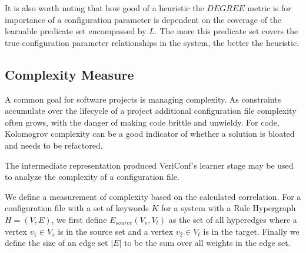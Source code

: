 It is also worth noting that how good of a heuristic the $DEGREE$ metric is for
importance of a configuration parameter is dependent on the coverage
of the learnable predicate set encompassed by $L$. The more this predicate
set covers the true configuration parameter relationships in the system,
the better the heuristic.

\iffalse

Intuitively, keywords that are seen together more often with defined relationships are more likely to generate rules within the learner.
 (it would be nice to show this with a quick derivation)

for a rule to be considered *true*, two conditions must hold:

1) adequate support -we have seen the keywords together x number of times

2) adequate confidence - how many times out of the x number of times was the relationship true?

\fi

\iffalse
- Open Questions
> What is the difference between {\it important} rules and
  {\it rules we are more sure about}?

> Why doesn't everything just sum to zero?

\fi
\subsection{Complexity Measure}

A common goal for software projects is managing complexity. As
constraints accumulate over the lifecycle of a project additional
configuration file complexity often grows, with the danger of
making code brittle and unwieldy. For code, Kolomogrov complexity
can be a good indicator of whether a solution is bloated and 
needs to be refactored.

The intermediate representation produced VeriConf's learner stage
may be used to analyze the complexity of a configuration file.


We define a measurement of complexity based on the calculated correlation.
For a configuration file with a set of keywords $K$ for a system
with a Rule Hypergraph $H = (V, E)$, we first define $E_{source}(V_s, V_t)$ as
the set of all hyperedges where a vertex $v_1 \in V_s$ is in the source set and
a vertex $v_2 \in V_t$ is in the target. Finally we define the size
of an edge set $|E|$ to be the sum over all weights in the edge set.

